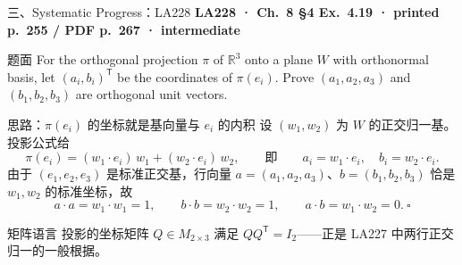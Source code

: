 \documentclass[aspectratio=169,10pt,fontset=none]{ctexbeamer}
\newcommand{\ex}[1]{\textcolor{accent}{\footnotesize\bfseries #1}}
\begin{document}
\begin{frame}[t]{三、Systematic Progress：LA228}
  \leavevmode\ex{LA228 · Ch.~8 §4 Ex.~4.19 · printed p.~255 / PDF p.~267 · intermediate}
  \begin{block}{\footnotesize 题面}
    \scriptsize For the orthogonal projection $\pi$ of $\mathbb R^3$ onto a plane $W$ with orthonormal basis, let $(a_i,b_i)^{\mathsf T}$ be the coordinates of $\pi(e_i)$. Prove $(a_1,a_2,a_3)$ and $(b_1,b_2,b_3)$ are orthogonal unit vectors.
  \end{block}
  \begin{exampleblock}{\footnotesize 思路：$\pi(e_i)$ 的坐标就是基向量与 $e_i$ 的内积}
    \scriptsize
    设 $(w_1,w_2)$ 为 $W$ 的正交归一基。投影公式给
    $$\pi(e_i)=(w_1\cdot e_i)\,w_1+(w_2\cdot e_i)\,w_2,\qquad\text{即}\qquad a_i=w_1\cdot e_i,\quad b_i=w_2\cdot e_i.$$
    由于 $(e_1,e_2,e_3)$ 是标准正交基，行向量 $a=(a_1,a_2,a_3)$、$b=(b_1,b_2,b_3)$ 恰是 $w_1,w_2$ 的标准坐标，故
    $$a\cdot a=w_1\cdot w_1=1,\qquad b\cdot b=w_2\cdot w_2=1,\qquad a\cdot b=w_1\cdot w_2=0.\ \square$$
  \end{exampleblock}
  \begin{block}{\footnotesize 矩阵语言}
    \scriptsize 投影的坐标矩阵 $Q\in M_{2\times3}$ 满足 $QQ^{\mathsf T}=I_2$——正是 LA227 中两行正交归一的一般根据。
  \end{block}
\end{frame}
\end{document}
